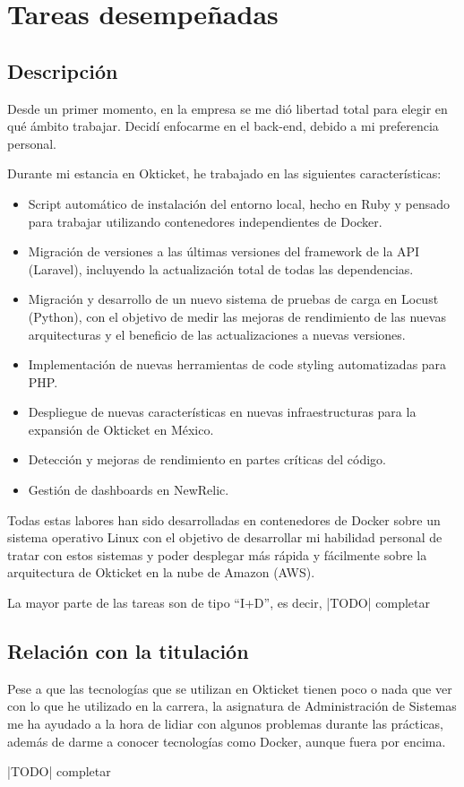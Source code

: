 \chapter{Tareas desempeñadas}
\section{Descripción}
Desde un primer momento, en la empresa se me dió libertad total para elegir en qué ámbito
trabajar. Decidí enfocarme en el back-end, debido a mi preferencia personal.

Durante mi estancia en Okticket, he trabajado en las siguientes características:
\begin{itemize}
	\item Script automático de instalación del entorno local, hecho en Ruby y pensado para
		trabajar utilizando contenedores independientes de Docker.
	\item Migración de versiones a las últimas versiones del framework de la API (Laravel),
		incluyendo la actualización total de todas las dependencias.
	\item Migración y desarrollo de un nuevo sistema de pruebas de carga en Locust (Python),
		con el objetivo de medir las mejoras de rendimiento de las nuevas arquitecturas y el
		beneficio de las actualizaciones a nuevas versiones.
	\item Implementación de nuevas herramientas de code styling automatizadas para PHP{.}
	\item Despliegue de nuevas características en nuevas infraestructuras para la expansión
		de Okticket en México.
	\item Detección y mejoras de rendimiento en partes críticas del código.
	\item Gestión de dashboards en NewRelic.
\end{itemize}

Todas estas labores han sido desarrolladas en contenedores de Docker sobre un sistema
operativo Linux con el objetivo de desarrollar mi habilidad personal de tratar con estos
sistemas y poder desplegar más rápida y fácilmente sobre la arquitectura de Okticket en la
nube de Amazon (AWS).

La mayor parte de las tareas son de tipo “I+D”, es decir,
|TODO| completar

\section{Relación con la titulación}
Pese a que las tecnologías que se utilizan en Okticket tienen poco o nada que ver con lo que
he utilizado en la carrera, la asignatura de Administración de Sistemas me ha ayudado a la hora
de lidiar con algunos problemas durante las prácticas, además de darme a conocer tecnologías
como Docker, aunque fuera por encima.

|TODO| completar
